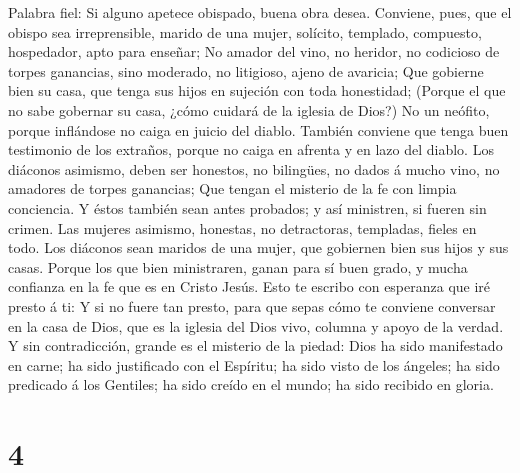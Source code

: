  Palabra fiel: Si alguno apetece obispado, buena obra
desea.  Conviene, pues, que el obispo sea irreprensible,
marido de una mujer, solícito, templado, compuesto, hospedador, apto
para enseñar;  No amador del vino, no heridor, no
codicioso de torpes ganancias, sino moderado, no litigioso, ajeno de
avaricia;  Que gobierne bien su casa, que tenga sus hijos
en sujeción con toda honestidad;  (Porque el que no sabe
gobernar su casa, ¿cómo cuidará de la iglesia de Dios?) 
No un neófito, porque inflándose no caiga en juicio del diablo.
 También conviene que tenga buen testimonio de los
extraños, porque no caiga en afrenta y en lazo del diablo.
 Los diáconos asimismo, deben ser honestos, no bilingües,
no dados á mucho vino, no amadores de torpes ganancias; 
Que tengan el misterio de la fe con limpia conciencia.  Y
éstos también sean antes probados; y así ministren, si fueren sin
crimen.  Las mujeres asimismo, honestas, no detractoras,
templadas, fieles en todo.  Los diáconos sean maridos de
una mujer, que gobiernen bien sus hijos y sus casas. 
Porque los que bien ministraren, ganan para sí buen grado, y mucha
confianza en la fe que es en Cristo Jesús.  Esto te
escribo con esperanza que iré presto á ti:  Y si no fuere
tan presto, para que sepas cómo te conviene conversar en la casa de
Dios, que es la iglesia del Dios vivo, columna y apoyo de la verdad.
 Y sin contradicción, grande es el misterio de la piedad:
Dios ha sido manifestado en carne; ha sido justificado con el Espíritu;
ha sido visto de los ángeles; ha sido predicado á los Gentiles; ha sido
creído en el mundo; ha sido recibido en gloria.

\hypertarget{section-3}{%
\section{4}\label{section-3}}

